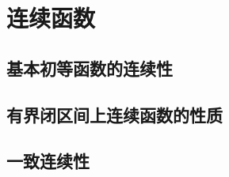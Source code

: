 \section{连续函数}
\subsection{基本初等函数的连续性}
\clearpage
\subsection{有界闭区间上连续函数的性质}
\clearpage
\subsection{一致连续性}
\clearpage
